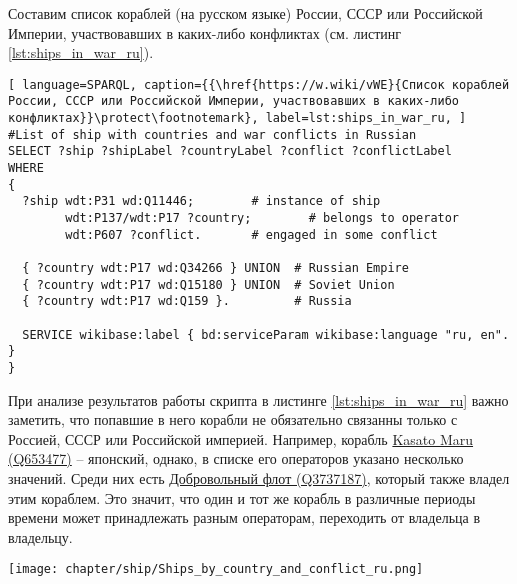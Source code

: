 Составим список кораблей (на русском языке) России, СССР или Российской Империи, участвовавших в каких-либо конфликтах (см. листинг \ref{lst:ships_in_war_ru}).

\begin{lstlisting}[ language=SPARQL, caption={{\href{https://w.wiki/vWE}{Список кораблей России, СССР или Российской Империи, участвовавших в каких-либо конфликтах}}\protect\footnotemark}, label=lst:ships_in_war_ru, ]
#List of ship with countries and war conflicts in Russian
SELECT ?ship ?shipLabel ?countryLabel ?conflict ?conflictLabel
WHERE
{
  ?ship wdt:P31 wd:Q11446;        # instance of ship
        wdt:P137/wdt:P17 ?country;        # belongs to operator
        wdt:P607 ?conflict.       # engaged in some conflict
  
  { ?country wdt:P17 wd:Q34266 } UNION  # Russian Empire
  { ?country wdt:P17 wd:Q15180 } UNION  # Soviet Union
  { ?country wdt:P17 wd:Q159 }.         # Russia

  SERVICE wikibase:label { bd:serviceParam wikibase:language "ru, en". }
}
\end{lstlisting}

При анализе результатов работы скрипта в листинге \ref{lst:ships_in_war_ru} важно заметить, что попавшие в него корабли не обязательно связанны только с Россией, СССР или Российской империей. Например, корабль \href{https://www.wikidata.org/wiki/Q653477}{Kasato Maru (Q653477)} -- японский, однако, в списке его операторов указано несколько значений. Среди них есть \href{https://www.wikidata.org/wiki/Q3737187}{Добровольный флот (Q3737187)}, который также владел этим кораблем. Это значит, что один и тот же корабль в различные периоды времени может принадлежать разным операторам, переходить от владельца в владельцу.
  

\begin{figure*}
  \texttt{[image: chapter/ship/Ships\_by\_country\_and\_conflict\_ru.png]}
  \caption[Список кораблей и конфликтов, в которых они участвовали]{Фрагмент cписка кораблей, связанных с Россией и участвовавших в военных конфликтах, 2017 год. Из списка видно, что больше большая часть кораблей связаны с Россией и СССР, а также со Второй мировой или Великой Отечественной войнами.}%
  \label{fig:ships_by_country_and_conflict}%
\end{figure*}